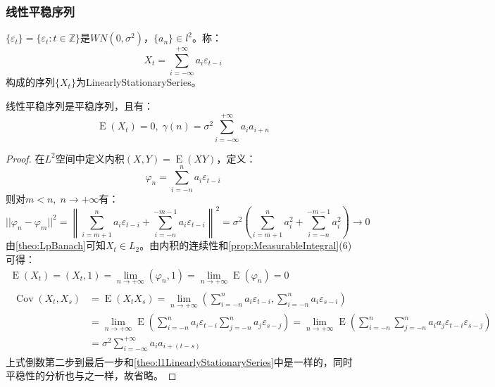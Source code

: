 \subsubsection{线性平稳序列}
\begin{definition}
	$\{\varepsilon_t\}=\{\varepsilon_t:t\in\mathbb{Z}\}$是$WN(0,\sigma^2)$，$\{a_n\}\in l^2$。称：
	\begin{equation*}
		X_t=\sum_{i=-\infty}^{+\infty}a_i\varepsilon_{t-i}
	\end{equation*}
	构成的序列$\{X_t\}$为\gls{LinearlyStationarySeries}。
\end{definition}
\begin{theorem}
	\label{theo:l2LinearlyStationarySeries}
	线性平稳序列是平稳序列，且有：
	\begin{equation*}
		\operatorname{E}(X_t)=0,\;\gamma(n)=\sigma^2\sum_{i=-\infty}^{+\infty}a_ia_{i+n}
	\end{equation*}
\end{theorem}
\begin{proof}
	在$L^2$空间中定义内积$(X,Y)=\operatorname{E}(XY)$，定义：
	\begin{equation*}
		\varphi_n=\sum_{i=-n}^{n}a_i\varepsilon_{t-i}
	\end{equation*}
	则对$m<n,\;n\to+\infty$有：
	\begin{equation*}
		||\varphi_n-\varphi_m||^2=\left\|\sum_{i=m+1}^{n}a_i\varepsilon_{t-i}+\sum_{i=-n}^{-m-1}a_i\varepsilon_{t-i}\right\|^2=\sigma^2\left(\sum_{i=m+1}^{n}a_i^2+\sum_{i=-n}^{-m-1}a_i^2\right)\to0
	\end{equation*}
	由\cref{theo:LpBanach}可知$X_t\in L_2$。由内积的连续性和\cref{prop:MeasurableIntegral}(6)可得：
	\begin{gather*}
		\operatorname{E}(X_t)=(X_t,1)=\lim_{n\to+\infty}(\varphi_n,1)=\lim_{n\to+\infty}\operatorname{E}(\varphi_n)=0 \\
		\begin{aligned}
			\operatorname{Cov}(X_t,X_s)&=\operatorname{E}(X_tX_s)=\lim_{n\to+\infty}\left(\sum_{i=-n}^{n}a_i\varepsilon_{t-i},\sum_{i=-n}^{n}a_i\varepsilon_{s-i}\right) \\
			&=\lim_{n\to+\infty}\operatorname{E}\left(\sum_{i=-n}^{n}a_i\varepsilon_{t-i}\sum_{j=-n}^{n}a_j\varepsilon_{s-j}\right)=\lim_{n\to+\infty}\operatorname{E}\left(\sum_{i=-n}^{n}\sum_{j=-n}^{n}a_ia_j\varepsilon_{t-i}\varepsilon_{s-j}\right) \\
			&=\sigma^2\sum_{i=-\infty}^{+\infty}a_ia_{i+(t-s)}
		\end{aligned}
	\end{gather*}
	上式倒数第二步到最后一步和\cref{theo:l1LinearlyStationarySeries}中是一样的，同时平稳性的分析也与之一样，故省略。
\end{proof}
